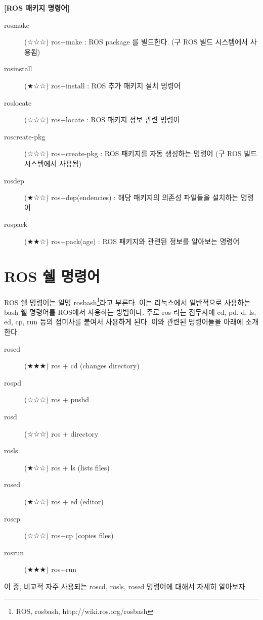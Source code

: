 \vspace{\baselineskip}
\noindent
\textbf{[ROS 패키지 명령어]}
\begin{description}
\item[rosmake] (☆☆☆) ros+make : ROS package 를 빌드한다. (구 ROS 빌드 시스템에서 사용됨)
\item[rosinstall] (★☆☆) ros+install : ROS 추가 패키지 설치 명령어
\item[roslocate] (☆☆☆) ros+locate : ROS 패키지 정보 관련 명령어 
\item[roscreate-pkg] (☆☆☆) ros+create-pkg : ROS 패키지를 자동 생성하는 명령어 (구 ROS 빌드 시스템에서 사용됨)
\item[rosdep] (★☆☆) ros+dep(endencies) : 해당 패키지의 의존성 파일들을 설치하는 명령어
\item[rospack] (★★☆) ros+pack(age) : ROS 패키지와 관련된 정보를 알아보는 명령어
\end{description}

\section{ROS 쉘 명령어}

ROS 쉘 명령어는 일명 rosbash\footnote{ROS, rosbash, http://wiki.ros.org/rosbash}라고 부른다. 이는 리눅스에서 일반적으로 사용하는 bash 쉘 명령어를 ROS에서 사용하는 방법이다. 주로 ros 라는 접두사에 cd, pd, d, ls, ed, cp, run 등의 접미사를 붙여서 사용하게 된다. 이와 관련된 명령어들을 아래에 소개한다.  

\vspace{\baselineskip}
\noindent
\begin{description}
\item[roscd] (★★★) ros + cd (changes directory) 
\item[rospd] (☆☆☆) ros + pushd 
\item[rosd] (☆☆☆) ros + directory
\item[rosls] (★☆☆) ros + ls (lists files)
\item[rosed] (★☆☆) ros + ed (editor)
\item[roscp] (☆☆☆) ros+cp (copies files)
\item[rosrun] (★★★) ros+run 
\end{description}

\vspace{\baselineskip}
\noindent
이 중, 비교적 자주 사용되는 roscd, rosls, rosed 명령어에 대해서 자세히 알아보자.

